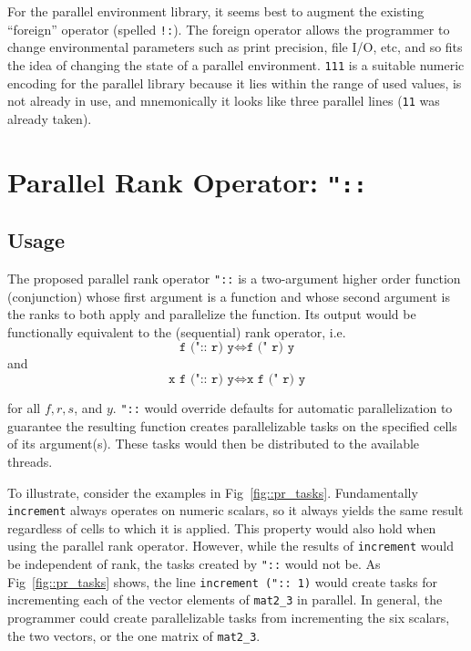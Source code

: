 For the parallel environment library, 
it seems best to augment the existing ``\gls{foreign}'' operator (spelled \texttt{!:}).  
The foreign operator allows
the programmer to change environmental parameters 
such as print precision, file I/O, etc\cite{jvocab}, 
and so fits the idea of changing the state of a parallel environment. 
\texttt{111} is a suitable numeric encoding for the parallel library because 
it lies within the range of used values, is not already in use, and 
mnemonically it looks like three parallel lines (\texttt{11} was already taken)\cite{jvocab}.

\section{Parallel Rank Operator: \texttt{"::}}
\label{prank}

\subsection{Usage}
The proposed parallel rank operator \texttt{"::} 
is a two-argument higher order function (conjunction)
whose first argument is a function 
and whose second argument is the ranks to both apply and parallelize the function. 
Its output would be functionally equivalent to the (sequential) rank operator, i.e. 
\[\texttt{f (":: r) y} \Leftrightarrow \texttt{f (" r) y}\] and
\[\texttt{x f (":: r) y} \Leftrightarrow \texttt{x f (" r) y}\]

\noindent for all $f, r, s$, and $y$.
\texttt{"::} would override defaults for automatic parallelization 
to guarantee the resulting function creates parallelizable tasks 
on the specified cells of its argument(s).
These tasks would then be distributed to the available threads.

To illustrate, consider the examples in Fig~\ref{fig::pr_tasks}. 
Fundamentally \texttt{increment} always operates on numeric scalars, 
so it always yields the same result regardless of cells to which it is applied. 
This property would also hold when using the parallel rank operator. 
However, while the results of \texttt{increment} would be independent of rank, 
the tasks created by \texttt{"::} would not be.
As Fig~\ref{fig::pr_tasks} shows, 
the line \texttt{increment (":: 1)} would create tasks 
for incrementing each of the vector elements of \texttt{mat2\_3} in parallel.
In general, the programmer could create parallelizable tasks from incrementing
the six scalars, the two vectors, or the one matrix of \texttt{mat2\_3}.

